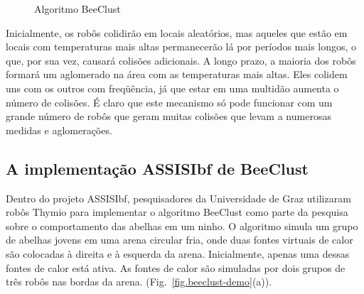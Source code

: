 \begin{figure}
\begin{center}
\end{center}
\caption{Algoritmo BeeClust}\label{fig.beeclust}
\end{figure}

Inicialmente, os robôs colidirão em locais aleatórios, mas aqueles que estão em locais com temperaturas mais altas permanecerão lá por períodos mais longos, o que, por sua vez, causará colisões adicionais. A longo prazo, a maioria dos robôs formará um aglomerado na área com as temperaturas mais altas. Eles colidem uns com os outros com freqüência, já que estar em uma multidão aumenta o número de colisões. É claro que este mecanismo só pode funcionar com um grande número de robôs que geram muitas colisões que levam a numerosas medidas e aglomerações. 

\subsection{A implementação ASSISIbf de BeeClust}

Dentro do projeto ASSISIbf, pesquisadores da Universidade de Graz utilizaram robôs Thymio para implementar o algoritmo BeeClust como parte da pesquisa sobre o comportamento das abelhas em um ninho. O algoritmo simula um grupo de abelhas jovens em uma arena circular fria, onde duas fontes virtuais de calor são colocadas à direita e à esquerda da arena. Inicialmente, apenas uma dessas fontes de calor está ativa. As fontes de calor são simuladas por dois grupos de três robôs nas bordas da arena. (Fig.~\ref{fig.beeclust-demo}(a)).

